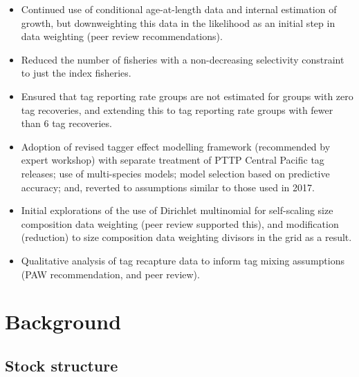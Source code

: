 \begin{itemize}
  \item Continued use of conditional age-at-length data and internal estimation of growth, but downweighting this data in the likelihood as an initial step in data weighting (peer review recommendations).
  \item Reduced the number of fisheries with a non-decreasing selectivity constraint to just the index fisheries.
  \item Ensured that tag reporting rate groups are not estimated for groups with zero tag recoveries, and extending this to tag reporting rate groups with fewer than 6 tag recoveries.
  \item Adoption of revised tagger effect modelling framework (recommended by expert workshop) with separate treatment of PTTP Central Pacific tag releases; use of multi-species models; model selection based on predictive accuracy; and, reverted to assumptions similar to those used in 2017.
  \item Initial explorations of the use of Dirichlet multinomial for self-scaling size composition data weighting (peer review supported this), and modification (reduction) to size composition data weighting divisors in the grid as a result.
  \item Qualitative analysis of tag recapture data to inform tag mixing assumptions (PAW recommendation, and peer review).
\end{itemize}

\section{Background}
\label{sec:background}

\subsection{Stock structure}
\label{sec:stock_structure}

